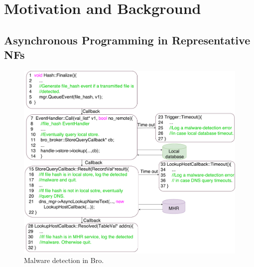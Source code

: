 \section{Motivation and Background}

\subsection {Asynchronous Programming in Representative NFs}
\label{sec:bro}

\begin{figure}[!h]
\centering
\includegraphics[width=\columnwidth]{chap-netstar/figure/ids_process_loop.pdf}
\caption{Malware detection in Bro.}
\label{fig:code-sample}
\end{figure}

